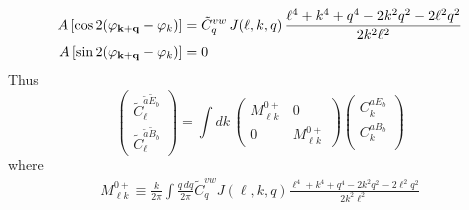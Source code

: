 \documentclass[a4paper,10pt]{article}
\begin{document}
\begin{itemize}
\begin{align}
          A\left[\cos2(\varphi_{{\bf k}+{\bf q}}-\varphi_k)\right]
          &=\tilde{C}^{vw}_q\,J(\ell,k,q)\,\frac{\ell^4+k^4+q^4-2k^2q^2-2\ell^2q^2}{2k^2\ell^2}\\
          A\left[\sin2(\varphi_{{\bf k}+{\bf q}}-\varphi_k)\right]&=0
        \end{align}
        Thus
        \begin{equation}
          \left(
          \begin{array}{c}
	    \tilde{C}^{\tilde{a}\tilde{E}_b}_\ell\\
	    \tilde{C}^{\tilde{a}\tilde{B}_b}_\ell
	  \end{array}\right)=\int dk\,
	  \left(
	  \begin{array}{cc}
	   M^{0+}_{\ell k} & 0 \\
	   0 & M^{0+}_{\ell k}
	  \end{array}\right)
          \left(
          \begin{array}{c}
           C^{aE_b}_k \\
           C^{aB_b}_k \\
          \end{array}\right)
        \end{equation}
        where
        \begin{align}
          M^{0+}_{\ell k}\equiv\frac{k}{2\pi}\int\frac{q\,dq}{2\pi}\tilde{C}^{vw}_qJ(\ell,k,q)\frac{\ell^4+k^4+q^4-2k^2q^2-2\ell^2q^2}{2k^2\ell^2}
        \end{align}


\end{itemize}
\end{document}
